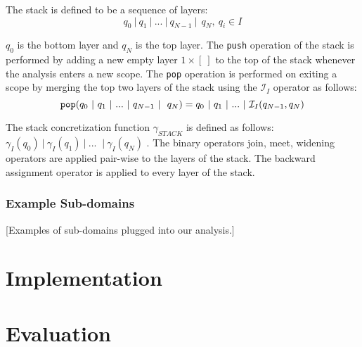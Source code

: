 \documentclass[]{report}
\begin{document}
The stack is defined to be a sequence of layers: 
$$ q_{0}\ \vert\ q_{1}\ \vert\ ...\ \vert\ q_{N-1}\ \vert\ \ q_{N},\ q_{i} \in I $$

 $ q_{0} $ is the bottom layer and $ q_{N} $ is the top layer. The \verb|push| operation of the stack is performed by adding a new empty layer $ 1 \times [\ ] $ to the top of the stack whenever the analysis enters a new scope. The \verb|pop| operation is performed on exiting a scope by merging the top two layers of the stack using the $ \mathcal{I}_{I} $ operator as follows: 
 $$ \verb|pop|(q_{0}\ \vert\ q_{1}\ \vert\ ...\ \vert\ q_{N-1}\ \vert\ \ q_{N}) = q_{0}\ \vert\ q_{1}\ \vert\ ...\ \vert\  \mathcal{I}_{I}(q_{N-1}, q_{N}) $$
 
 The stack concretization function $ \gamma_{STACK} $ is defined as follows: $\gamma_{I}(q_{0})\ \vert\ \gamma_{I}(q_{1})\ \vert\ ...$ $\ \vert\ \gamma_{I}(q_{N})$ . The binary operators join, meet, widening operators are applied pair-wise to the layers of the stack. The backward assignment operator is applied to every layer of the stack. 

\subsection{Example Sub-domains} \label{example-domains}

[Examples of sub-domains plugged into our analysis.]

\chapter{Implementation}

\chapter{Evaluation}



\end{document}
